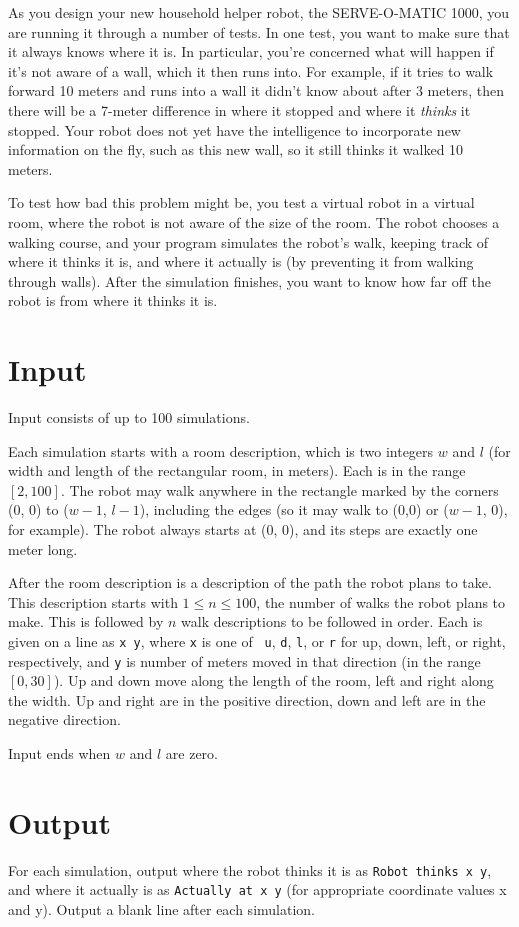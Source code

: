 

As you design your new household helper robot, the SERVE-O-MATIC 1000, you are
running it through a number of tests. In one test, you want
to make sure that it always knows where it is. In particular, you're concerned
what will happen if it's not aware of a wall, which it then runs into.
For example, if it tries to walk forward 10 meters and runs into a wall it
didn't know about after 3 meters, then there will be a 7-meter difference in
where it stopped and where it {\em thinks} it stopped. Your robot does not yet
have the intelligence to incorporate new information on the fly, such as this
new wall, so it still thinks it walked 10 meters.

To test how bad this problem might be, you test a virtual robot in a
virtual room, where the robot is not aware of the size of the room. The robot
chooses a walking course, and your program simulates the robot's walk,
keeping track of where it thinks it is, and where it actually is (by preventing
it from walking through walls).  After the simulation finishes, you want to know
how far off the robot is from where it thinks it is.

\section*{Input}

Input consists of up to 100 simulations. 

Each simulation starts with a room description, which is two 
integers $w$ and $l$ (for width and length of the rectangular room, in meters).
Each is in the range $[2, 100]$.
The robot may walk anywhere in the rectangle marked by the corners (0, 0) to
($w-1$, $l-1$), including the edges (so it may walk to (0,0) or
($w-1$, 0), for example). The robot always starts at (0, 0), and its
steps are exactly one meter long.

After the room description is a description of the path the robot plans to
take. This description starts with $1 \le n \le 100$, the number of walks the
robot plans to make. This is followed by $n$ walk descriptions to be followed
in order. Each is given on a line as {\tt x y}, where {\tt x} is one of {\tt
u}, {\tt d}, {\tt l}, or {\tt r} for up, down, left, or right, respectively,
and {\tt y} is number of meters moved in that direction (in the range $[0,
30]$).  Up and down move along the length of the room, left and right along the
width.  Up and right are in the positive direction, down and left are in the
negative direction.

Input ends when $w$ and $l$ are zero.

\section*{Output}

For each simulation, output where the robot thinks it is as 
{\tt Robot thinks x y}, and where it actually is as {\tt Actually at x y} (for
appropriate coordinate values x and y). Output a blank line after each
simulation.

